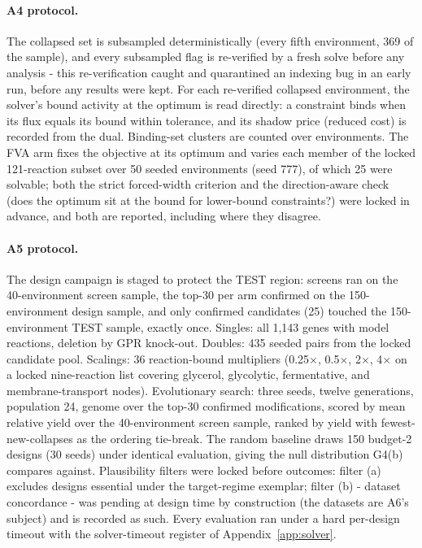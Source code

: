 \documentclass[12pt]{article}
\begin{document}
\paragraph{A4 protocol.} The collapsed set is subsampled
deterministically (every fifth environment, 369 of the sample), and
every subsampled flag is re-verified by a fresh solve before any
analysis - this re-verification caught and quarantined an indexing
bug in an early run, before any results were kept. For each
re-verified collapsed environment, the solver's bound activity at the
optimum is read directly: a constraint binds when its flux equals its
bound within tolerance, and its shadow price (reduced cost) is
recorded from the dual. Binding-set clusters are counted over
environments. The FVA arm fixes the objective at its optimum and
varies each member of the locked 121-reaction subset over 50 seeded
environments (seed 777), of which 25 were solvable; both the strict
forced-width criterion and the direction-aware check (does the optimum
sit at the bound for lower-bound constraints?) were locked in advance,
and both are reported, including where they disagree.

\paragraph{A5 protocol.} The design campaign is staged to protect the
TEST region: screens ran on the 40-environment screen sample, the
top-30 per arm confirmed on the 150-environment design sample, and
only confirmed candidates (25) touched the 150-environment TEST
sample, exactly once. Singles: all 1{,}143 genes with model reactions,
deletion by GPR knock-out. Doubles: 435 seeded pairs from the locked
candidate pool. Scalings: 36 reaction-bound multipliers
(0.25$\times$, 0.5$\times$, 2$\times$, 4$\times$ on a locked
nine-reaction list covering glycerol, glycolytic, fermentative, and
membrane-transport nodes). Evolutionary search: three seeds, twelve
generations, population 24, genome over the top-30 confirmed
modifications, scored by mean relative yield over the 40-environment screen sample, ranked by yield with fewest-new-collapses as the ordering tie-break. The random baseline draws 150 budget-2 designs (30 seeds)
under identical evaluation, giving the null distribution G4(b)
compares against. Plausibility filters were locked before outcomes:
filter (a) excludes designs essential under the target-regime
exemplar; filter (b) - dataset concordance - was pending at design
time by construction (the datasets are A6's subject) and is recorded
as such. Every evaluation ran under a hard per-design timeout with
the solver-timeout register of Appendix~\ref{app:solver}.
\end{document}

